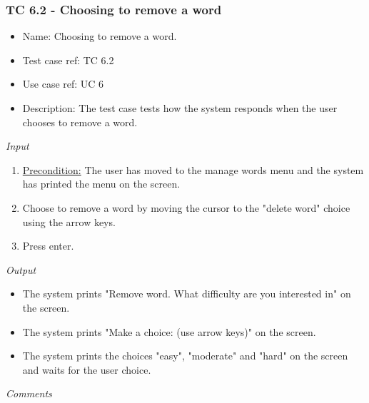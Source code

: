 \documentclass[12pt, letterpaper]{article}
\begin{document}
\subsubsection{TC 6.2 - Choosing to remove a word}
\begin{itemize}
	\item Name: Choosing to remove a word.
	\item Test case ref: TC 6.2
	\item Use case ref: UC 6
	\item Description: The test case tests how the system responds when the user chooses to remove a word.
\end{itemize}
\emph{Input}
\begin{enumerate}
	\item \underline{Precondition:} The user has moved to the manage words menu and the system has printed the menu on the screen.
	\item Choose to remove a word by moving the cursor to the "delete word" choice using the arrow keys.
	\item Press enter.
\end{enumerate}
\emph{Output}
\begin{itemize}
	\item The system prints "Remove word. What difficulty are you interested in" on the screen.
	\item The system prints "Make a choice: (use arrow keys)" on the screen.
	\item The system prints the choices "easy", "moderate" and "hard" on the screen and waits for the user choice.
\end{itemize}
\begin{Form}
	\newline
	\newline
\end{Form}
\newline
\emph{Comments}
\newline
\newline
\newline
\newline
\newline
\newline
\newline
\end{document}
